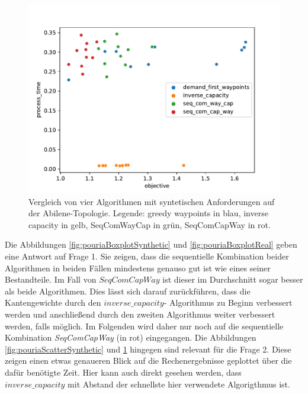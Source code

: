 \documentclass[sigconf, nonacm, review]{acmart}
\begin{document}
\begin{figure}
\centering
\includegraphics[width=\linewidth]{figures/pouria_colored_scatter_plot_results_real_demands.pdf}
\caption{Vergleich von vier Algorithmen mit syntetischen Anforderungen auf der Abilene-Topologie. Legende: greedy waypoints in blau, inverse capacity in gelb, SeqComWayCap in gr\"un, SeqComCapWay in rot.}
\label{fig:pouriaScatterReal}
\end{figure}
Die Abbildungen \ref{fig:pouriaBoxplotSynthetic} und \ref{fig:pouriaBoxplotReal} geben eine Antwort auf Frage 1.\newline
Sie zeigen, 
dass die sequentielle Kombination beider Algorithmen in beiden F\"allen mindestens genauso gut ist wie eines seiner Bestandteile. 
Im Fall von $SeqComCapWay$ ist dieser im Durchschnitt sogar besser als beide Algorithmen.
Dies l\"asst sich darauf zur\"uckf\"uhren, 
dass die Kantengewichte durch den $inverse\_capacity$-\newline
Algorithmus zu Beginn verbessert werden 
und anschlie\ss end durch den zweiten Algorithmus weiter verbessert werden, falls m\"oglich.
Im Folgenden wird daher nur noch auf die sequentielle Kombination \emph{SeqComCapWay} (in rot) eingegangen.\newline
Die Abbildungen \ref{fig:pouriaScatterSynthetic} und \ref{fig:pouriaScatterReal} hingegen sind relevant f\"ur die Frage 2. 
Diese zeigen einen etwas genaueren Blick auf die Rechenergebnisse geplottet \"uber die daf\"ur ben\"otigte Zeit.
Hier kann auch direkt gesehen werden, dass $inverse\_capacity$ mit Abstand der schnellste hier verwendete Algorigthmus ist.
\end{document}
